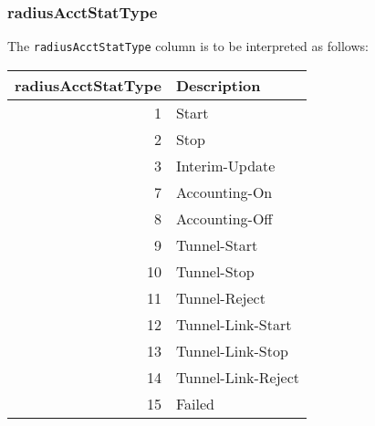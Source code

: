 \documentclass[documentation]{subfiles}
\begin{document}
\subsubsection{radiusAcctStatType}\label{radiusAcctStatType}
The {\tt radiusAcctStatType} column is to be interpreted as follows:
\begin{longtable}{rl}
    \toprule
    {\bf radiusAcctStatType} & {\bf Description}\\
    \midrule\endhead%
     1 & Start\\
     2 & Stop\\
     3 & Interim-Update\\
     7 & Accounting-On\\
     8 & Accounting-Off\\
     9 & Tunnel-Start\\
    10 & Tunnel-Stop\\
    11 & Tunnel-Reject\\
    12 & Tunnel-Link-Start\\
    13 & Tunnel-Link-Stop\\
    14 & Tunnel-Link-Reject\\
    15 & Failed\\
    \bottomrule
\end{longtable}
\end{document}
